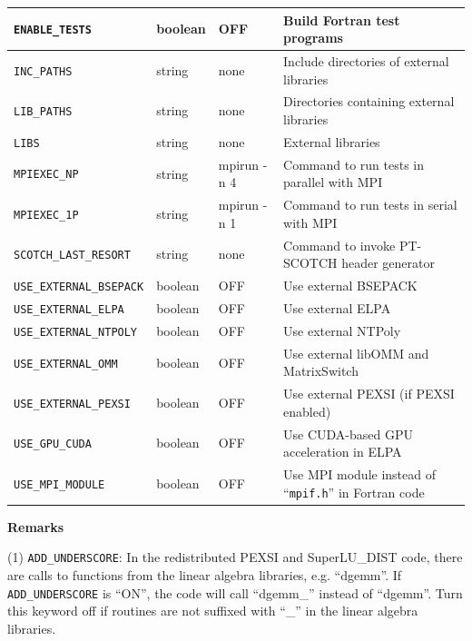 \documentclass{report}
\begin{document}
\begin{longtable}[]{|p{40mm}|p{15mm}|p{20mm}|p{87mm}|}
\hline
\texttt{ENABLE\_TESTS}            & boolean & OFF         & Build Fortran test programs\\
\hline
\texttt{INC\_PATHS}               & string  & none        & Include directories of external libraries\\
\hline
\texttt{LIB\_PATHS}               & string  & none        & Directories containing external libraries\\
\hline
\texttt{LIBS}                     & string  & none        & External libraries\\
\hline
\texttt{MPIEXEC\_NP}              & string  & mpirun -n 4 & Command to run tests in parallel with MPI\\
\hline
\texttt{MPIEXEC\_1P}              & string  & mpirun -n 1 & Command to run tests in serial with MPI\\
\hline

\texttt{SCOTCH\_LAST\_RESORT}     & string  & none        & Command to invoke PT-SCOTCH header generator\\
\hline
\texttt{USE\_EXTERNAL\_BSEPACK}   & boolean & OFF         & Use external BSEPACK\\
\hline
\texttt{USE\_EXTERNAL\_ELPA}      & boolean & OFF         & Use external ELPA\\
\hline
\texttt{USE\_EXTERNAL\_NTPOLY}    & boolean & OFF         & Use external NTPoly\\
\hline
\texttt{USE\_EXTERNAL\_OMM}       & boolean & OFF         & Use external libOMM and MatrixSwitch\\
\hline
\texttt{USE\_EXTERNAL\_PEXSI}     & boolean & OFF         & Use external PEXSI (if PEXSI enabled)\\
\hline
\texttt{USE\_GPU\_CUDA}           & boolean & OFF         & Use CUDA-based GPU acceleration in ELPA\\
\hline
\texttt{USE\_MPI\_MODULE}         & boolean & OFF         & Use MPI module instead of ``\texttt{mpif.h}'' in Fortran code\\
\hline
\end{longtable}

\textbf{Remarks}

(1) \texttt{ADD\_UNDERSCORE}: In the redistributed PEXSI and SuperLU\_DIST code, there are calls to functions from the linear algebra libraries, e.g. ``dgemm''. If \texttt{ADD\_UNDERSCORE} is ``ON'', the code will call ``dgemm\_'' instead of ``dgemm''. Turn this keyword off if routines are not suffixed with ``\_'' in the linear algebra libraries.
\end{document}
